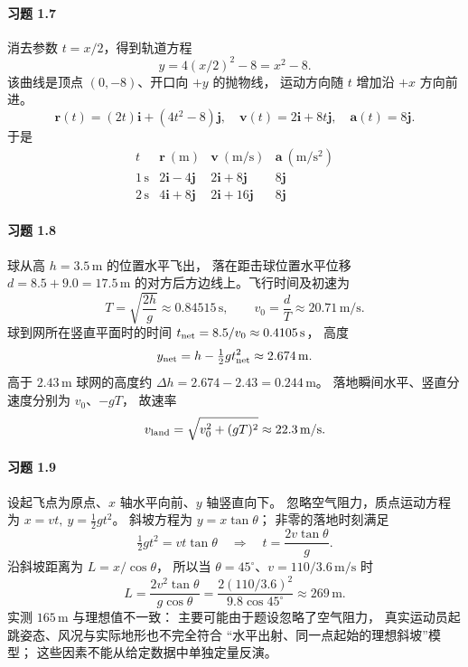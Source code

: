 \paragraph{习题 1.7}
消去参数 \(t=x/2\)，得到轨道方程
\[
 y=4(x/2)^2-8=x^2-8.
\]
该曲线是顶点 \((0,-8)\)、开口向 \(+y\) 的抛物线，
运动方向随 \(t\) 增加沿 \(+x\) 方向前进。
\[
 \boldsymbol r(t)=(2t)\boldsymbol i+(4t^2-8)\boldsymbol j,\quad
 \boldsymbol v(t)=2\boldsymbol i+8t\boldsymbol j,\quad
 \boldsymbol a(t)=8\boldsymbol j.
\]
于是
\[
 \begin{array}{c|c|c|c}
 t & \boldsymbol r\ (\mathrm m)
 &\boldsymbol v\ (\mathrm{m/s})&\boldsymbol a\ (\mathrm{m/s^2})\\\hline
 1\,\mathrm s&2\boldsymbol i-4\boldsymbol j&
 2\boldsymbol i+8\boldsymbol j&8\boldsymbol j\\
 2\,\mathrm s&4\boldsymbol i+8\boldsymbol j&
 2\boldsymbol i+16\boldsymbol j&8\boldsymbol j
 \end{array}
\]

\paragraph{习题 1.8}
球从高 \(h=3.5\,\mathrm{m}\) 的位置水平飞出，
落在距击球位置水平位移 \(d=8.5+9.0=17.5\,\mathrm{m}\)
的对方后方边线上。飞行时间及初速为
\[
 T=\sqrt{\frac{2h}{g}}\approx0.84515\,\mathrm{s},\qquad
 v_0=\frac{d}{T}\approx20.71\,\mathrm{m/s}.
\]
球到网所在竖直平面时的时间
\(t_{\rm net}=8.5/v_0\approx0.4105\,\mathrm{s}\)，
高度
\[
 y_{\rm net}=h-\tfrac12g t_{\rm net}^2\approx2.674\,\mathrm{m}.
\]
高于 \(2.43\,\mathrm{m}\) 球网的高度约
\(\Delta h=2.674-2.43=0.244\,\mathrm{m}\)。
落地瞬间水平、竖直分速度分别为 \(v_0\)、\(-gT\)，
故速率
\[
 v_{\rm land}=\sqrt{v_0^2+(gT)^2}\approx22.3\,\mathrm{m/s}.
\]

\paragraph{习题 1.9}
设起飞点为原点、\(x\) 轴水平向前、\(y\) 轴竖直向下。
忽略空气阻力，质点运动方程为
\(x=vt,\ y=\frac12gt^2\)。
斜坡方程为 \(y=x\tan\theta\)；
非零的落地时刻满足
\[
 \tfrac12gt^2=vt\tan\theta
 \quad\Rightarrow\quad t=\frac{2v\tan\theta}{g}.
\]
沿斜坡距离为 \(L=x/\cos\theta\)，
所以当 \(\theta=45^\circ\)、\(v=110/3.6\,\mathrm{m/s}\) 时
\[
 L=\frac{2v^2\tan\theta}{g\cos\theta}
 =\frac{2(110/3.6)^2}{9.8\cos45^\circ}
 \approx269\,\mathrm{m}.
\]
实测 \(165\,\mathrm{m}\) 与理想值不一致：
主要可能由于题设忽略了空气阻力，
真实运动员起跳姿态、风况与实际地形也不完全符合
“水平出射、同一点起始的理想斜坡”模型；
这些因素不能从给定数据中单独定量反演。

